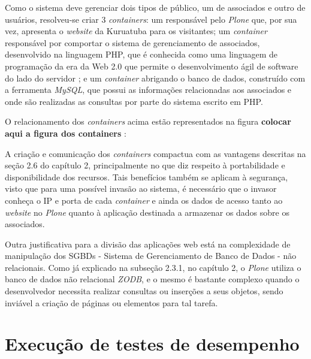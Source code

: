 \hspace{2.5cm}

Como o sistema deve gerenciar dois tipos de público, um de associados e outro de usuários, resolveu-se criar 3 \textit{containers}: um responsável pelo \textit{Plone} que, por sua vez, apresenta o \textit{website} da Kuruatuba para os visitantes; um \textit{container} responsável por comportar o sistema de gerenciamento de associados, desenvolvido na linguagem PHP, que é conhecida como uma linguagem de programação da era da Web 2.0 que permite o desenvolvimento ágil de software do lado do servidor ; e um \textit{container} abrigando o banco de dados, construído com a ferramenta \textit{MySQL}, que possui as informações relacionadas aos associados e onde são realizadas as consultas por parte do sistema escrito em PHP.

O relacionamento dos \textit{containers} acima estão representados na figura  \textbf{colocar aqui a figura dos containers} :


A criação e comunicação dos \textit{containers} compactua com as vantagens descritas na seção 2.6 do capítulo 2, principalmente no que diz respeito à portabilidade e disponibilidade dos recursos. Tais benefícios também se aplicam à segurança, visto que para uma possível invasão ao sistema, é necessário que o invasor conheça o IP e porta de cada \textit{container} e ainda os dados de acesso tanto ao \textit{website} no \textit{Plone} quanto à aplicação destinada a armazenar os dados sobre os associados.   

Outra justificativa para a divisão das aplicações web está na complexidade de manipulação dos SGBDs - Sistema de Gerenciamento de Banco de Dados - não relacionais. Como já explicado na subseção 2.3.1, no capítulo 2, o \textit{Plone} utiliza o banco de dados não relacional \textit{ZODB}, e o mesmo é bastante complexo quando o desenvolvedor necessita realizar consultas ou inserções a seus objetos, sendo inviável a criação de páginas ou elementos para tal tarefa.  

\hspace{2.5cm}
\section{Execução de testes de desempenho}
\label{sec:testes}
\hspace{2.5cm}

